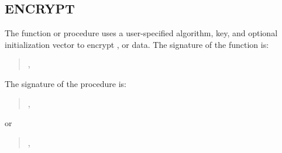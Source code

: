\documentclass[letterpaper,10pt,english,openany,oneside]{sphinxmanual}
\begin{document}
\subsection{ENCRYPT}
\label{\detokenize{encrypt::doc}}\label{\detokenize{encrypt:encrypt}}
The  function or procedure uses a user-specified algorithm, key,
and optional initialization vector to encrypt ,  or  data.
The signature of the  function is:
\begin{quote}

\begin{DUlineblock}{0em}
\item[] 
\item[]
\begin{DUlineblock}{\DUlineblockindent}
\item[] ,
\item[] 
\end{DUlineblock}
\end{DUlineblock}
\end{quote}

The signature of the  procedure is:
\begin{quote}

\begin{DUlineblock}{0em}
\item[] 
\item[]
\begin{DUlineblock}{\DUlineblockindent}
\item[] ,
\item[] 
\end{DUlineblock}
\end{DUlineblock}
\end{quote}

or
\begin{quote}

\begin{DUlineblock}{0em}
\item[] 
\item[]
\begin{DUlineblock}{\DUlineblockindent}
\item[] ,
\item[] 
\end{DUlineblock}
\end{DUlineblock}
\end{quote}
\end{document}
